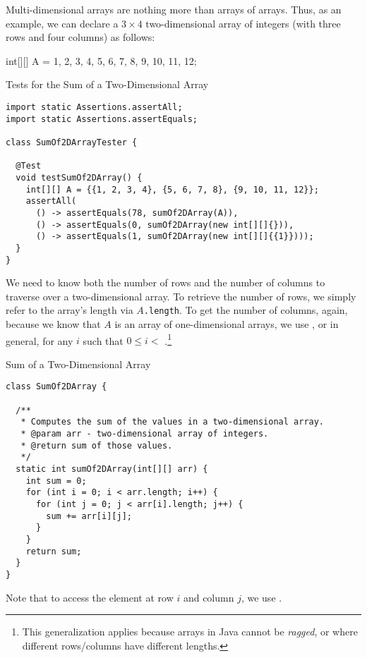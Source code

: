 Multi-dimensional arrays are nothing more than arrays of arrays. Thus, as an example, we can declare a $3 \times 4$ two-dimensional array of integers (with three rows and four columns) as follows:
\begin{verbnobox}[\small]
int[][] A = {{1, 2, 3, 4}, {5, 6, 7, 8}, {9, 10, 11, 12}};
\end{verbnobox}

\begin{cl}[]{Tests for the Sum of a Two-Dimensional Array}
\begin{lstlisting}[language=MyJava]
import static Assertions.assertAll;
import static Assertions.assertEquals;

class SumOf2DArrayTester {

  @Test
  void testSumOf2DArray() {
    int[][] A = {{1, 2, 3, 4}, {5, 6, 7, 8}, {9, 10, 11, 12}};
    assertAll(
      () -> assertEquals(78, sumOf2DArray(A)),
      () -> assertEquals(0, sumOf2DArray(new int[][]{})),
      () -> assertEquals(1, sumOf2DArray(new int[][]{{1}})));
  }
}
\end{lstlisting}
\end{cl}

We need to know both the number of rows and the number of columns to traverse over a two-dimensional array. To retrieve the number of rows, we simply refer to the array's length via \texttt{$A$.length}. To get the number of columns, again, because we know that $A$ is an array of one-dimensional arrays, we use , or in general,  for any $i$ such that $0 \leq i< $ .\footnote{This generalization applies because arrays in Java cannot be \emph{ragged}, or where different rows/columns have different lengths.}

\begin{cl}[]{Sum of a Two-Dimensional Array}
\begin{lstlisting}[language=MyJava]
class SumOf2DArray {

  /**
   * Computes the sum of the values in a two-dimensional array.
   * @param arr - two-dimensional array of integers.
   * @return sum of those values.
   */
  static int sumOf2DArray(int[][] arr) {
    int sum = 0;
    for (int i = 0; i < arr.length; i++) {
      for (int j = 0; j < arr[i].length; j++) {
        sum += arr[i][j];
      }
    }
    return sum;
  }
}
\end{lstlisting}
\end{cl}

Note that to access the element at row $i$ and column $j$, we use . 

